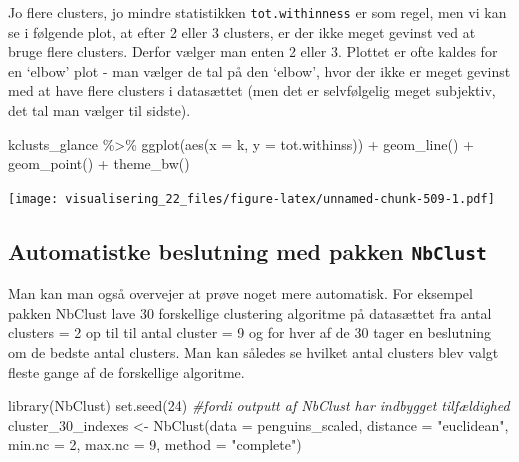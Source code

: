\documentclass[
]{book}
\newenvironment{Shaded}{\begin{snugshade}}{\end{snugshade}}
\newcommand{\AttributeTok}[1]{\textcolor[rgb]{0.77,0.63,0.00}{#1}}
\newcommand{\CommentTok}[1]{\textcolor[rgb]{0.56,0.35,0.01}{\textit{#1}}}
\newcommand{\DecValTok}[1]{\textcolor[rgb]{0.00,0.00,0.81}{#1}}
\newcommand{\FunctionTok}[1]{\textcolor[rgb]{0.00,0.00,0.00}{#1}}
\newcommand{\NormalTok}[1]{#1}
\newcommand{\OtherTok}[1]{\textcolor[rgb]{0.56,0.35,0.01}{#1}}
\newcommand{\SpecialCharTok}[1]{\textcolor[rgb]{0.00,0.00,0.00}{#1}}
\newcommand{\StringTok}[1]{\textcolor[rgb]{0.31,0.60,0.02}{#1}}
\begin{document}
Jo flere clusters, jo mindre statistikken \texttt{tot.withinness} er som regel, men vi kan se i følgende plot, at efter 2 eller 3 clusters, er der ikke meget gevinst ved at bruge flere clusters. Derfor vælger man enten 2 eller 3. Plottet er ofte kaldes for en `elbow' plot - man vælger de tal på den `elbow', hvor der ikke er meget gevinst med at have flere clusters i datasættet (men det er selvfølgelig meget subjektiv, det tal man vælger til sidste).

\begin{Shaded}
\begin{Highlighting}[]
\NormalTok{kclusts\_glance }\SpecialCharTok{\%\textgreater{}\%} 
  \FunctionTok{ggplot}\NormalTok{(}\FunctionTok{aes}\NormalTok{(}\AttributeTok{x =}\NormalTok{ k, }\AttributeTok{y =}\NormalTok{ tot.withinss)) }\SpecialCharTok{+} 
  \FunctionTok{geom\_line}\NormalTok{() }\SpecialCharTok{+} 
  \FunctionTok{geom\_point}\NormalTok{() }\SpecialCharTok{+} 
  \FunctionTok{theme\_bw}\NormalTok{()}
\end{Highlighting}
\end{Shaded}

\texttt{[image: visualisering\_22\_files/figure-latex/unnamed-chunk-509-1.pdf]}

\hypertarget{automatistke-beslutning-med-pakken-nbclust}{%
\subsection{\texorpdfstring{Automatistke beslutning med pakken \texttt{NbClust}}{Automatistke beslutning med pakken NbClust}}\label{automatistke-beslutning-med-pakken-nbclust}}

Man kan man også overvejer at prøve noget mere automatisk. For eksempel pakken NbClust lave 30 forskellige clustering algoritme på datasættet fra antal clusters = 2 op til til antal cluster = 9 og for hver af de 30 tager en beslutning om de bedste antal clusters. Man kan således se hvilket antal clusters blev valgt fleste gange af de forskellige algoritme.

\begin{Shaded}
\begin{Highlighting}[]
\FunctionTok{library}\NormalTok{(NbClust)}
\FunctionTok{set.seed}\NormalTok{(}\DecValTok{24}\NormalTok{) }\CommentTok{\#fordi outputt af NbClust har indbygget tilfældighed}
\NormalTok{cluster\_30\_indexes }\OtherTok{\textless{}{-}} \FunctionTok{NbClust}\NormalTok{(}\AttributeTok{data =}\NormalTok{ penguins\_scaled, }
                              \AttributeTok{distance =} \StringTok{"euclidean"}\NormalTok{, }
                              \AttributeTok{min.nc =} \DecValTok{2}\NormalTok{, }
                              \AttributeTok{max.nc =} \DecValTok{9}\NormalTok{, }
                              \AttributeTok{method =} \StringTok{"complete"}\NormalTok{)}
\end{Highlighting}
\end{Shaded}
\end{document}
